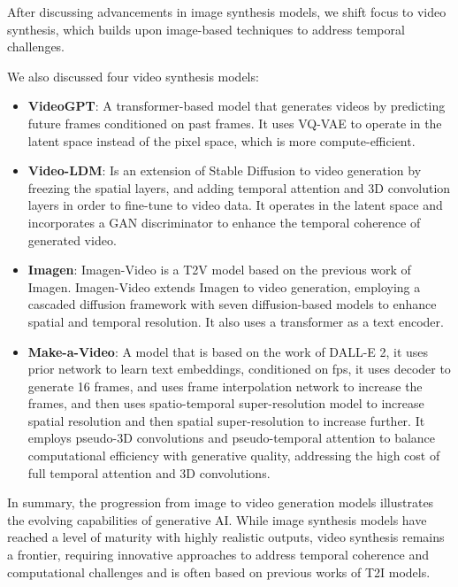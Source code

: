 After discussing advancements in image synthesis models, we shift focus to video synthesis, which builds upon image-based techniques to address temporal challenges.

We also discussed four video synthesis models:

\begin{itemize}
    \item \textbf{VideoGPT}: A transformer-based model that generates videos by predicting future frames conditioned on past frames. It uses VQ-VAE to operate in the latent space instead of the pixel space, which is more compute-efficient.
    
    \item \textbf{Video-LDM}: Is an extension of Stable Diffusion to video generation by freezing the spatial layers, and adding temporal attention and 3D convolution layers in order to fine-tune to video data. It operates in the latent space and incorporates a GAN discriminator to enhance the temporal coherence of generated video.
    
    \item \textbf{Imagen}: Imagen-Video is a T2V model based on the previous work of Imagen. Imagen-Video extends Imagen to video generation, employing a cascaded diffusion framework with seven diffusion-based models to enhance spatial and temporal resolution. It also uses a transformer as a text encoder.
    
    \item \textbf{Make-a-Video}: A model that is based on the work of DALL-E 2, it uses prior network to learn text embeddings, conditioned on fps, it uses decoder to generate 16 frames, and uses frame interpolation network to increase the frames, and then uses spatio-temporal super-resolution model to increase spatial resolution and then spatial super-resolution to increase further. It employs pseudo-3D convolutions and pseudo-temporal attention to balance computational efficiency with generative quality, addressing the high cost of full temporal attention and 3D convolutions.
\end{itemize}

In summary, the progression from image to video generation models illustrates the evolving capabilities of generative AI. While image synthesis models have reached a level of maturity with highly realistic outputs, video synthesis remains a frontier, requiring innovative approaches to address temporal coherence and computational challenges and is often based on previous works of T2I models.